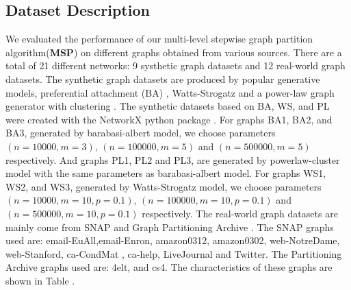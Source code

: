\documentclass{acm_proc_article-sp}
\begin{document}
\subsection{Dataset Description}
We evaluated the performance of our multi-level stepwise graph partition algorithm(\textbf{MSP}) on  different graphs obtained from various sources. There are a total of 21 different networks: 9 systhetic graph datasets and 12 real-world graph datasets. The synthetic graph datasets are produced by popular generative models, preferential attachment (BA) \cite{barabasi:emergence}, Watts-Strogatz \cite{small-world-watts-strogatz} and a power-law graph generator with clustering \cite{Holme2002}. The synthetic datasets based on BA, WS, and PL were created with the NetworkX python package \cite{url:networkx}. For graphs BA1, BA2, and BA3, generated by barabasi-albert model, we choose parameters $(n=10000, m=3)$, $(n=100000, m=5)$ and $(n=500000, m=5)$ respectively. And graphs PL1, PL2 and PL3, are generated by powerlaw-cluster model with the same parameters as barabasi-albert model. For graphs WS1, WS2, and WS3, generated by Watts-Strogatz model, we choose parameters $(n=10000, m=10, p=0.1)$, $(n=100000, m=10, p=0.1)$ and $(n=500000, m=10, p=0.1)$ respectively. The real-world graph datasets  are mainly come from SNAP\cite{url:snap} and Graph Partitioning Archive \cite{url:gpa}. The SNAP graphs used are: email-EuAll,email-Enron, amazon0312, amazon0302, web-NotreDame, web-Stanford, ca-CondMat , ca-help, LiveJournal and Twitter. The Partitioning Archive graphs used are:  4elt, and cs4. The characteristics of these graphs are shown in Table .
\end{document}
